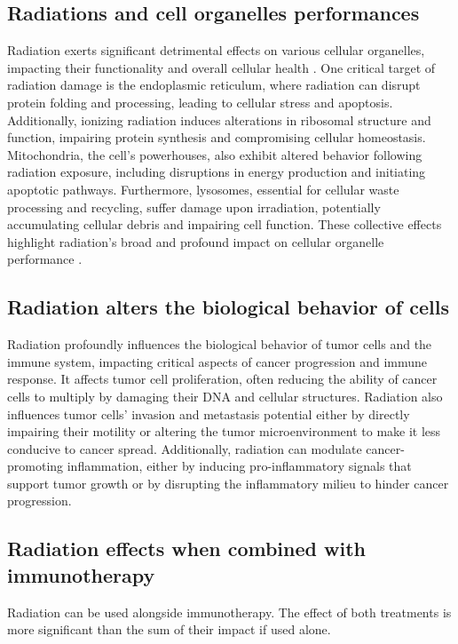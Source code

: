 \subsection{Radiations and cell organelles performances}
Radiation exerts significant detrimental effects on various cellular organelles, impacting their functionality and overall cellular health \cite{Somosy2000}.
One critical target of radiation damage is the endoplasmic reticulum, where radiation can disrupt protein folding and processing, leading to cellular stress and apoptosis.
Additionally, ionizing radiation induces alterations in ribosomal structure and function, impairing protein synthesis and compromising cellular homeostasis.
Mitochondria, the cell's powerhouses, also exhibit altered behavior following radiation exposure, including disruptions in energy production and initiating apoptotic pathways.
Furthermore, lysosomes, essential for cellular waste processing and recycling, suffer damage upon irradiation, potentially accumulating cellular debris and impairing cell function.
These collective effects highlight radiation's broad and profound impact on cellular organelle performance \cite{Wang2018}.

\subsection{Radiation alters the biological behavior of cells}
Radiation profoundly influences the biological behavior of tumor cells and the immune system, impacting critical aspects of cancer progression and immune response.
It affects tumor cell proliferation, often reducing the ability of cancer cells to multiply by damaging their DNA and cellular structures.
Radiation also influences tumor cells' invasion and metastasis potential either by directly impairing their motility or altering the tumor microenvironment to make it less conducive to cancer spread.
Additionally, radiation can modulate cancer-promoting inflammation, either by inducing pro-inflammatory signals that support tumor growth or by disrupting the inflammatory milieu to hinder cancer progression.

\subsection{Radiation effects when combined with immunotherapy}
Radiation can be used alongside immunotherapy.
The effect of both treatments is more significant than the sum of their impact if used alone.

